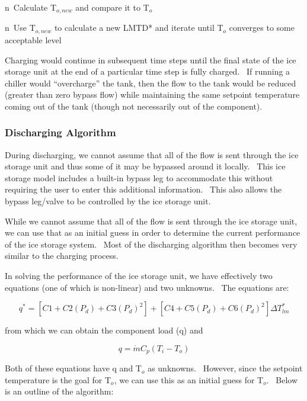 n~Calculate T\(_{o,new}\) and compare it to T\(_{o}\)

n~Use T\(_{o,new}\) to calculate a new LMTD* and iterate until T\(_{o}\) converges to some acceptable level

Charging would continue in subsequent time steps until the final state of the ice storage unit at the end of a particular time step is fully charged.~ If running a chiller would ``overcharge'' the tank, then the flow to the tank would be reduced (greater than zero bypass flow) while maintaining the same setpoint temperature coming out of the tank (though not necessarily out of the component).

\subsubsection{Discharging Algorithm}\label{discharging-algorithm}

During discharging, we cannot assume that all of the flow is sent through the ice storage unit and thus some of it may be bypassed around it locally.~ This ice storage model includes a built-in bypass leg to accommodate this without requiring the user to enter this additional information.~ This also allows the bypass leg/valve to be controlled by the ice storage unit.

While we cannot assume that all of the flow is sent through the ice storage unit, we can use that as an initial guess in order to determine the current performance of the ice storage system.~ Most of the discharging algorithm then becomes very similar to the charging process.

In solving the performance of the ice storage unit, we have effectively two equations (one of which is non-linear) and two unknowns.~ The equations are:

\begin{equation}
{q^*} = \left[ {C1 + C2\left( {{P_d}} \right) + C3{{\left( {{P_d}} \right)}^2}} \right] + \left[ {C4 + C5\left( {{P_d}} \right) + C6{{\left( {{P_d}} \right)}^2}} \right]\Delta T_{lm}^*
\end{equation}

from which we can obtain the component load (q) and

\begin{equation}
q = \dot m{C_p}\left( {{T_i} - {T_o}} \right)
\end{equation}

Both of these equations have q and T\(_{o}\) as unknowns.~ However, since the setpoint temperature is the goal for T\(_{o}\), we can use this as an initial guess for T\(_{o}\).~ Below is an outline of the algorithm:

